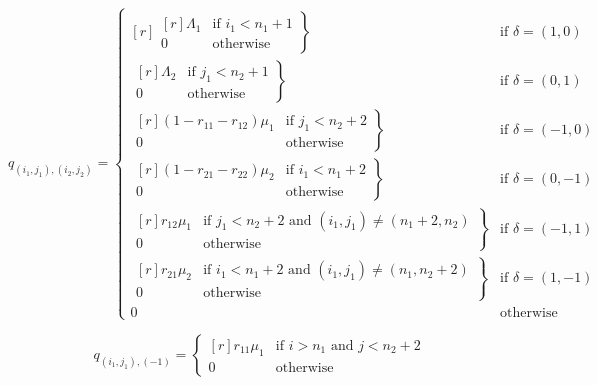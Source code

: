 \documentclass{article}
\numberwithin{equation}{section}
\begin{document}
\begin{equation}
  q_{(i_1, j_1),(i_2, j_2)} = \left\{
  \begin{matrix*}[ r ]
    \left. \begin{matrix*}[ r ]
      \Lambda_1 & \text{if } i_1 < n_1 + 1 \\
      0 & \text{otherwise}
    \end{matrix*} \right\} & \text{if } \delta = (1, 0) \\
    \left. \begin{matrix*}[ r ]
      \Lambda_2 & \text{if } j_1 < n_2 + 1 \\
      0 & \text{otherwise}
    \end{matrix*} \right\} & \text{if } \delta = (0, 1) \\
    \left. \begin{matrix*}[ r ]
      (1 - r_{11} - r_{12})\mu_1 & \text{if } j_1 < n_2 + 2 \\
      0 & \text{otherwise}
    \end{matrix*} \right\} & \text{if } \delta = (-1, 0) \\
    \left. \begin{matrix*}[ r ]
      (1 - r_{21} - r_{22})\mu_2 & \text{if } i_1 < n_1 + 2 \\
      0 & \text{otherwise}
    \end{matrix*} \right\} & \text{if } \delta = (0, -1) \\
    \left. \begin{matrix*}[ r ]
      r_{12}\mu_1 & \text{if } j_1 < n_2 + 2 \text{ and } (i_1, j_1) \neq (n_1 + 2, n_2) \\
      0 & \text{otherwise}
    \end{matrix*} \right\} & \text{if } \delta = (-1, 1) \\
    \left. \begin{matrix*}[ r ]
      r_{21}\mu_2 & \text{if } i_1 < n_1 + 2 \text{ and } (i_1, j_1) \neq (n_1, n_2 + 2) \\
      0 & \text{otherwise}
    \end{matrix*} \right\} & \text{if } \delta = (1, -1) \\
    0 & \text{otherwise}
  \end{matrix*} \right.
\end{equation}

\begin{equation}\label{equ:todeadlock2}
  q_{(i_1, j_1), (-1)} = \left\{
  \begin{matrix*}[ r ]
    r_{11}\mu_1 & \text{if } i > n_1 \text{ and } j < n_2 + 2 \\
    0 & \text{otherwise}
  \end{matrix*}
  \right.
\end{equation}
\end{document}
